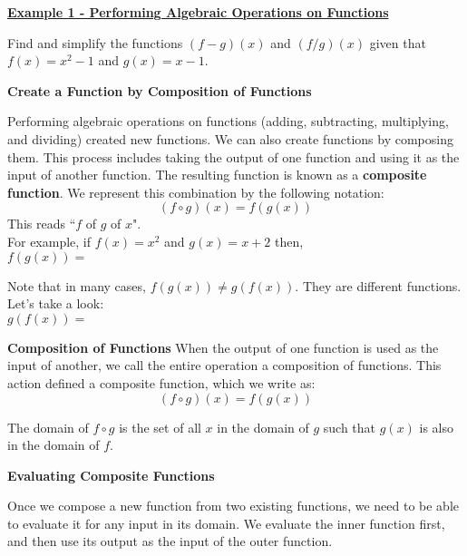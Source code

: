 \documentclass[12pt]{book}
\begin{document}
\underline{\textbf{Example 1 - Performing Algebraic Operations on Functions}}
\vspace{3mm}

Find and simplify the functions $(f-g)(x)$ and $(f/g)(x)$ given that $f(x)=x^2-1$ and $g(x)=x-1$.
\vspace{1mm}
\newpage

{\large \textbf{Create a Function by Composition of Functions}}

Performing algebraic operations on functions (adding, subtracting, multiplying, and dividing) created new functions. We can also create functions by composing them. This process includes taking the output of one function and using it as the input of another function. The resulting function is known as a \textbf{composite function}. We represent this combination by the following notation:
$$(f \circ g)(x) = f(g(x))$$
This reads ``$f$ of $g$ of $x$".
\\

For example, if $f(x) = x^2$ and $g(x)=x+2$ then,
\\

   $f(g(x))= $

   \vspace{50mm}




Note that in many cases, $f(g(x)) \neq g(f(x))$. They are different functions. Let's take a look:
\\

   $g(f(x))= $

   \vspace{50mm}

\newpage


\begin{boxR}
    \textbf{Composition of Functions}
    \vspace{1mm}
    \hline
    \vspace{2mm}
   When the output of one function is used as the input of another, we call the entire operation a composition of functions. This action defined a composite function, which we write as:
   $$ (f \circ g)(x) = f(g(x))$$

 The domain of $f \circ g$ is the set of all $x$ in the domain of $g$ such that $g(x)$ is also in the domain of $f$. 
\end{boxR}
{\large \textbf{Evaluating Composite Functions}}
\vspace{1mm}

Once we compose a new function from two existing functions, we need to be able to evaluate it for any input in its domain. We evaluate the inner function first, and then use its output as the input of the outer function.
\end{document}
